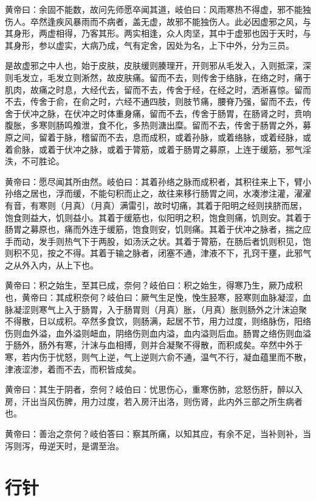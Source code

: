 \documentclass[a4paper,12pt,UTF8,twoside]{ctexbook}
\begin{document}
	黄帝曰：余固不能数，故问先师愿卒闻其道，岐伯曰：风雨寒热不得虚，邪不能独伤人。卒然逢疾风暴雨而不病者，盖无虚，故邪不能独伤人。此必因虚邪之风，与其身形，两虚相得，乃客其形。两实相逢，众人肉坚，其中于虚邪也因于天时，与其身形，参以虚实，大病乃成，气有定舍，因处为名，上下中外，分为三员。
	
	是故虚邪之中人也，始于皮肤，皮肤缓则腠理开，开则邪从毛发入，入则抵深，深则毛发立，毛发立则淅然，故皮肤痛。留而不去，则传舍于络脉，在络之时，痛于肌肉，故痛之时息，大经代去，留而不去，传舍于经，在经之时，洒淅喜惊。留而不去，传舍于俞，在俞之时，六经不通四肢，则肢节痛，腰脊乃强，留而不去，传舍于伏冲之脉，在伏冲之时体重身痛，留而不去，传舍于肠胃，在肠肾之时，贲响腹胀，多寒则肠鸣飧泄，食不化，多热则溏出糜。留而不去，传舍于肠胃之外，募原之间，留着于脉，稽留而不去，息而成积，或着孙脉，或着络脉，或着经脉，或着俞脉，或着于伏冲之脉，或着于膂筋，或着于肠胃之募原，上连于缓筋，邪气淫泆，不可胜论。
	
	黄帝曰：愿尽闻其所由然。岐伯曰：其着孙络之脉而成积者，其积往来上下，臂小孙络之居也，浮而缓，不能句积而止之，故往来移行肠胃之间，水凑渗注灌，濯濯有音，有寒则（月真）（月真）满雷引，故时切痛，其着于阳明之经则挟脐而居，饱食则益大，饥则益小。其着于缓筋也，似阳明之积，饱食则痛，饥则安。其着于肠胃之募原也，痛而外连于缓筋，饱食则安，饥则痛。其着于伏冲之脉者，揣之应手而动，发手则热气下于两股，如汤沃之状。其着于膂筋，在肠后者饥则积见，饱则积不见，按之不得。其着于输之脉者，闭塞不通，津液不下，孔窍干壅，此邪气之从外入内，从上下也。
	
	黄帝曰：积之始生，至其已成，奈何？岐伯曰：积之始生，得寒乃生，厥乃成积也，黄帝曰：其成积奈何？岐伯曰：厥气生足悗，悗生胫寒，胫寒则血脉凝涩，血脉凝涩则寒气上入于肠胃，入于肠胃则（月真）胀，（月真）胀则肠外之汁沫迫聚不得散，日以成积。卒然多食饮，则肠满，起居不节，用力过度，则络脉伤，阳络伤则血外溢，血外溢则衄血，阴络伤则血内溢，血内溢则后血。肠胃之络伤则血溢于肠外，肠外有寒，汁沫与血相搏，则并合凝聚不得散，而积成矣。卒然中外于寒，若内伤于忧怒，则气上逆，气上逆则六俞不通，温气不行，凝血蕴里而不散，津液涩渗，着而不去，而积皆成矣。
	
	黄帝曰：其生于阴者，奈何？岐伯曰：忧思伤心，重寒伤肺，忿怒伤肝，醉以入房，汗出当风伤脾，用力过度，若入房汗出洛，则伤肾，此内外三部之所生病者也。
	
	黄帝曰：善治之奈何？岐伯答曰：察其所痛，以知其应，有余不足，当补则补，当泻则泻，毋逆天时，是谓至治。
	
	\chapter{行针}
	
\end{document}
